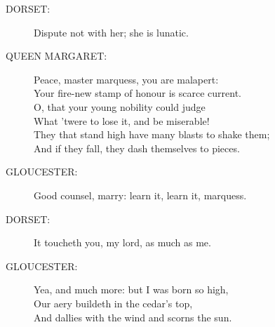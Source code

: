 \documentclass{article}
\begin{document}
\begin{description}
\item[DORSET:] 
\hspace{1pt}Dispute not with her; she is lunatic.\\
\end{description}
\begin{description}
\item[QUEEN MARGARET:] 
\hspace{1pt}Peace, master marquess, you are malapert:\\
\hspace{1pt}Your fire-new stamp of honour is scarce current.\\
\hspace{1pt}O, that your young nobility could judge\\
\hspace{1pt}What 'twere to lose it, and be miserable!\\
\hspace{1pt}They that stand high have many blasts to shake them;\\
\hspace{1pt}And if they fall, they dash themselves to pieces.\\
\end{description}
\begin{description}
\item[GLOUCESTER:] 
\hspace{1pt}Good counsel, marry: learn it, learn it, marquess.\\
\end{description}
\begin{description}
\item[DORSET:] 
\hspace{1pt}It toucheth you, my lord, as much as me.\\
\end{description}
\begin{description}
\item[GLOUCESTER:] 
\hspace{1pt}Yea, and much more: but I was born so high,\\
\hspace{1pt}Our aery buildeth in the cedar's top,\\
\hspace{1pt}And dallies with the wind and scorns the sun.\\
\end{description}
\end{document}
